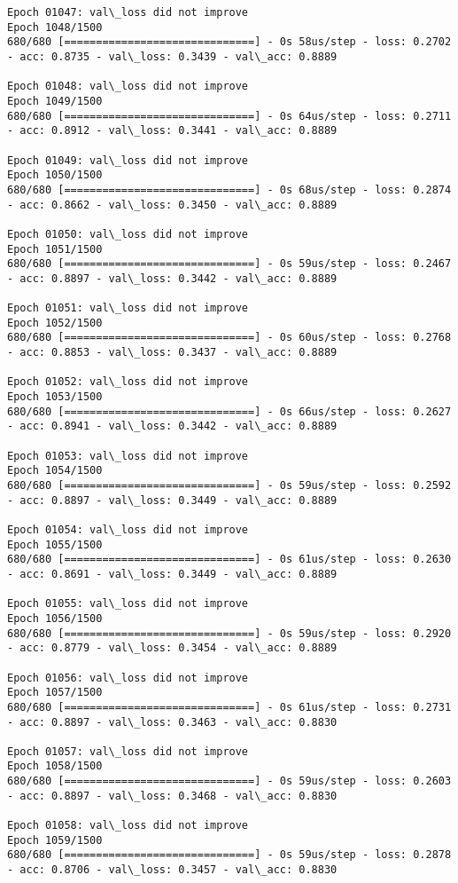 \documentclass[11pt]{article}
\begin{document}
\begin{Verbatim}[commandchars=\\\{\}]
Epoch 01047: val\_loss did not improve
Epoch 1048/1500
680/680 [==============================] - 0s 58us/step - loss: 0.2702 - acc: 0.8735 - val\_loss: 0.3439 - val\_acc: 0.8889

Epoch 01048: val\_loss did not improve
Epoch 1049/1500
680/680 [==============================] - 0s 64us/step - loss: 0.2711 - acc: 0.8912 - val\_loss: 0.3441 - val\_acc: 0.8889

Epoch 01049: val\_loss did not improve
Epoch 1050/1500
680/680 [==============================] - 0s 68us/step - loss: 0.2874 - acc: 0.8662 - val\_loss: 0.3450 - val\_acc: 0.8889

Epoch 01050: val\_loss did not improve
Epoch 1051/1500
680/680 [==============================] - 0s 59us/step - loss: 0.2467 - acc: 0.8897 - val\_loss: 0.3442 - val\_acc: 0.8889

Epoch 01051: val\_loss did not improve
Epoch 1052/1500
680/680 [==============================] - 0s 60us/step - loss: 0.2768 - acc: 0.8853 - val\_loss: 0.3437 - val\_acc: 0.8889

Epoch 01052: val\_loss did not improve
Epoch 1053/1500
680/680 [==============================] - 0s 66us/step - loss: 0.2627 - acc: 0.8941 - val\_loss: 0.3442 - val\_acc: 0.8889

Epoch 01053: val\_loss did not improve
Epoch 1054/1500
680/680 [==============================] - 0s 59us/step - loss: 0.2592 - acc: 0.8897 - val\_loss: 0.3449 - val\_acc: 0.8889

Epoch 01054: val\_loss did not improve
Epoch 1055/1500
680/680 [==============================] - 0s 61us/step - loss: 0.2630 - acc: 0.8691 - val\_loss: 0.3449 - val\_acc: 0.8889

Epoch 01055: val\_loss did not improve
Epoch 1056/1500
680/680 [==============================] - 0s 59us/step - loss: 0.2920 - acc: 0.8779 - val\_loss: 0.3454 - val\_acc: 0.8889

Epoch 01056: val\_loss did not improve
Epoch 1057/1500
680/680 [==============================] - 0s 61us/step - loss: 0.2731 - acc: 0.8897 - val\_loss: 0.3463 - val\_acc: 0.8830

Epoch 01057: val\_loss did not improve
Epoch 1058/1500
680/680 [==============================] - 0s 59us/step - loss: 0.2603 - acc: 0.8897 - val\_loss: 0.3468 - val\_acc: 0.8830

Epoch 01058: val\_loss did not improve
Epoch 1059/1500
680/680 [==============================] - 0s 59us/step - loss: 0.2878 - acc: 0.8706 - val\_loss: 0.3457 - val\_acc: 0.8830


\end{Verbatim}
\end{document}
